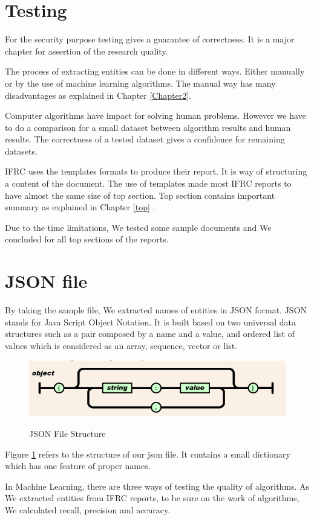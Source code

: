 \newpage
\section{Testing}\label{chp4}
For the security purpose testing gives a guarantee of correctness.  It is a major chapter for assertion of the research quality.

The process of extracting entities can be done in different ways. Either manually or by the use of machine learning algorithms. The manual way has many disadvantages as explained in Chapter \ref{Chapter2}.

Computer algorithms have impact for solving human problems. However we have to do a comparison for a small dataset between algorithm results and human results. The correctness of a tested dataset gives a confidence for remaining datasets.

IFRC uses the templates formats to produce their report. It is way of structuring a content of the document. The use of templates made most IFRC reports to have almost  the same size of top section. Top section contains important summary  as explained in Chapter \ref{top} .

Due to the time limitations, We tested  some  sample documents and We concluded for all top sections of the reports.
\section*{JSON file }
By taking the sample file, We extracted names of entities in JSON format. JSON stands for Java Script Object Notation. It is built based on two universal data structures such as a pair composed by a name and a value, and ordered list of values which is considered as an array, sequence, vector or list.
\begin{figure}[hbtp]
\caption{JSON File Structure \citep{bray2014javascript}}
\centering
\includegraphics[scale=.7]{images/json.png}\label{json}
\end{figure}


Figure \ref{json}
refers to the structure of our json file. It contains a small dictionary which has one feature of proper names.

In Machine Learning, there are three ways of testing the quality of algorithms. As We extracted  entities from IFRC reports, to be sure on the work of algorithms,  We calculated recall, precision and accuracy. 


